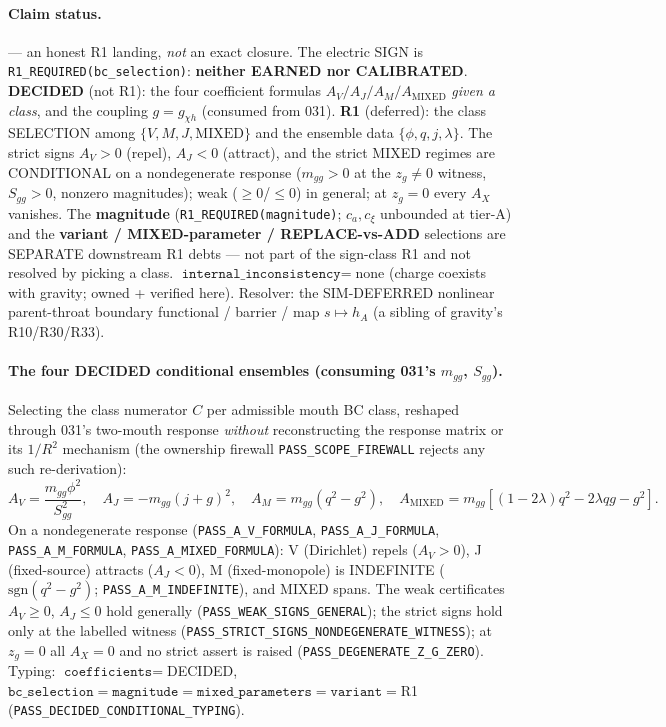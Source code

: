 \paragraph{Claim status.}
\StatusOpen{} --- an honest R1 landing, \emph{not} an exact closure. The electric
SIGN is \texttt{R1\_REQUIRED(bc\_selection)}: \textbf{neither EARNED nor
CALIBRATED}. \textbf{DECIDED} (not R1): the four coefficient formulas
\(A_V/A_J/A_M/A_{\mathrm{MIXED}}\) \emph{given a class}, and the coupling
\(g=g_{\chi h}\) (consumed from 031). \textbf{R1} (deferred): the class SELECTION
among \(\{V,M,J,\mathrm{MIXED}\}\) and the ensemble data \(\{\phi,q,j,\lambda\}\).
The strict signs \(A_V>0\) (repel), \(A_J<0\) (attract), and the strict MIXED
regimes are CONDITIONAL on a nondegenerate response (\(m_{gg}>0\) at the
\(z_g\ne0\) witness, \(S_{gg}>0\), nonzero magnitudes); weak (\(\ge0\)/\(\le0\)) in
general; at \(z_g=0\) every \(A_X\) vanishes. The \textbf{magnitude}
(\texttt{R1\_REQUIRED(magnitude)}; \(c_a,c_\xi\) unbounded at tier-A) and the
\textbf{variant / MIXED-parameter / REPLACE-vs-ADD} selections are SEPARATE
downstream R1 debts --- not part of the sign-class R1 and not resolved by picking a
class. \(\texttt{internal\_inconsistency}=\)none (charge coexists with gravity;
owned + verified here). Resolver: the SIM-DEFERRED nonlinear parent-throat boundary
functional / barrier / map \(s\mapsto h_A\) (a sibling of gravity's R10/R30/R33).

\paragraph{The four DECIDED conditional ensembles (consuming 031's \(m_{gg}\), \(S_{gg}\)).}
Selecting the class numerator \(C\) per admissible mouth BC class, reshaped through
031's two-mouth response \emph{without} reconstructing the response matrix or its
\(1/R^2\) mechanism (the ownership firewall \texttt{PASS\_SCOPE\_FIREWALL} rejects
any such re-derivation):
\[
  A_V=\frac{m_{gg}\phi^2}{S_{gg}^2},\quad
  A_J=-m_{gg}(j+g)^2,\quad
  A_M=m_{gg}(q^2-g^2),\quad
  A_{\mathrm{MIXED}}=m_{gg}\!\left[(1-2\lambda)q^2-2\lambda qg-g^2\right].
\]
On a nondegenerate response (\texttt{PASS\_A\_V\_FORMULA},
\texttt{PASS\_A\_J\_FORMULA}, \texttt{PASS\_A\_M\_FORMULA},
\texttt{PASS\_A\_MIXED\_FORMULA}): V (Dirichlet) repels (\(A_V>0\)), J
(fixed-source) attracts (\(A_J<0\)), M (fixed-monopole) is INDEFINITE
(\(\mathrm{sgn}(q^2-g^2)\); \texttt{PASS\_A\_M\_INDEFINITE}), and MIXED spans. The
weak certificates \(A_V\ge0\), \(A_J\le0\) hold generally
(\texttt{PASS\_WEAK\_SIGNS\_GENERAL}); the strict signs hold only at the labelled
witness (\texttt{PASS\_STRICT\_SIGNS\_NONDEGENERATE\_WITNESS}); at \(z_g=0\) all
\(A_X=0\) and no strict assert is raised
(\texttt{PASS\_DEGENERATE\_Z\_G\_ZERO}). Typing: \(\texttt{coefficients}=\)DECIDED,
\(\texttt{bc\_selection}=\texttt{magnitude}=\texttt{mixed\_parameters}=\texttt{variant}=\)R1
(\texttt{PASS\_DECIDED\_CONDITIONAL\_TYPING}).

